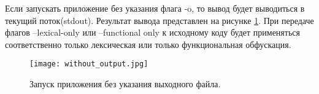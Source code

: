 Если запускать приложение без указания флага -o, то вывод будет выводиться в текущий поток(stdout). Результат вывода представлен на рисунке \ref{fig:sec:usage:without_output}.
При передаче флагов --lexical-only или --functional only к исходному коду будет применяться соответственно только лексическая или только функциональная обфускация.


\begin{landscape}
\thispagestyle{lscape}
\begin{figure}[ht]
\centering
  \texttt{[image: without\_output.jpg]}
  \caption{ Запуск приложения без указания выходного файла. }
  \label{fig:sec:usage:without_output}
\end{figure}
\end{landscape}


